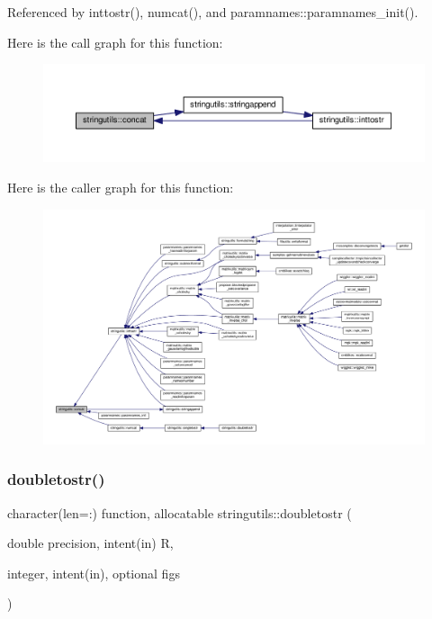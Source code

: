 Referenced by inttostr(), numcat(), and paramnames\+::paramnames\+\_\+init().

Here is the call graph for this function\+:
\nopagebreak
\begin{figure}[H]
\begin{center}
\leavevmode
\includegraphics[width=350pt]{namespacestringutils_a19e683b9de4f769c4fe0afc48a7b45d0_cgraph}
\end{center}
\end{figure}
Here is the caller graph for this function\+:
\nopagebreak
\begin{figure}[H]
\begin{center}
\leavevmode
\includegraphics[width=350pt]{namespacestringutils_a19e683b9de4f769c4fe0afc48a7b45d0_icgraph}
\end{center}
\end{figure}
\mbox{\label{namespacestringutils_adb471f3dd9f3594d60675ae521b568a7}} 
\subsubsection{\texorpdfstring{doubletostr()}{doubletostr()}}
{\footnotesize\ttfamily character(len=\+:) function, allocatable stringutils\+::doubletostr (\begin{DoxyParamCaption}\item[{double precision, intent(in)}]{R,  }\item[{integer, intent(in), optional}]{figs }\end{DoxyParamCaption})}



